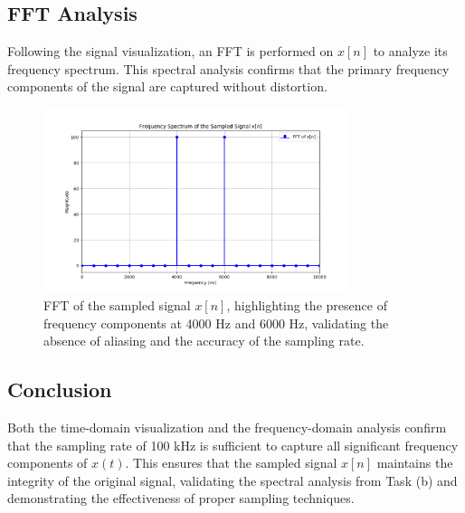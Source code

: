 \subsection*{FFT Analysis}
Following the signal visualization, an FFT is performed on $x[n]$ to analyze its frequency spectrum. This spectral analysis confirms that the primary frequency components of the signal are captured without distortion.

\begin{figure}[h]
    \centering
    \includegraphics[width=0.8\textwidth]{fig/ex1_c_fft_plot.png}
    \caption{FFT of the sampled signal $x[n]$, highlighting the presence of frequency components at 4000 Hz and 6000 Hz, validating the absence of aliasing and the accuracy of the sampling rate.}
    \label{fig:ex1c_fft_analysis}
\end{figure}

\subsection*{Conclusion}
Both the time-domain visualization and the frequency-domain analysis confirm that the sampling rate of 100 kHz is sufficient to capture all significant frequency components of $x(t)$. This ensures that the sampled signal $x[n]$ maintains the integrity of the original signal, validating the spectral analysis from Task (b) and demonstrating the effectiveness of proper sampling techniques.
